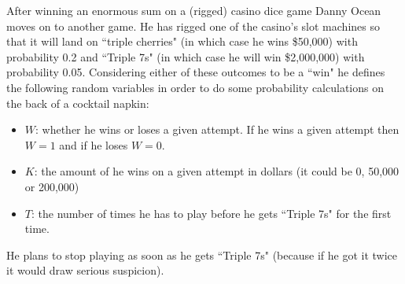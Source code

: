 \documentclass[addpoints]{examsetup}\usepackage[]{graphicx}\usepackage[]{color}
\begin{document}
\begin{questions}
\question 

After winning an enormous sum on a (rigged) casino dice game Danny Ocean moves on to another game.
He has rigged one of the casino's slot machines so that it will land on ``triple cherries" (in which case he wins \$50,000) with probability 0.2 and ``Triple 7s" (in which case he will win  \$2,000,000) with probability 0.05.
Considering either of these outcomes to be a ``win" he defines the following random variables in order to do some probability calculations on the back of a cocktail napkin:

\begin{itemize}
   \item $W$: whether he wins or loses a given attempt. If he wins a given attempt then $W = 1$ and if he loses $W = 0$.
   \item $K$: the amount of he wins on a given attempt in dollars (it could be 0, 50,000 or 200,000)
   \item $T$: the number of times he has to play before he gets ``Triple 7s" for the first time.
\end{itemize}

He plans to stop playing as soon as he gets ``Triple 7s" (because if he got it twice it would draw serious suspicion).

\end{questions}
\end{document}
